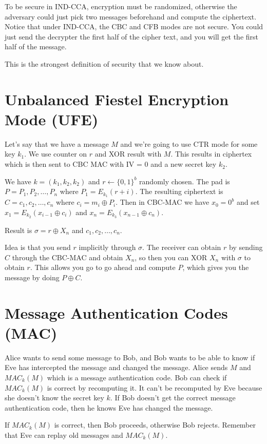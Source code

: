 \documentclass[psamsfonts]{amsart}
\begin{document}
To be secure in IND-CCA, encryption must be randomized, otherwise the adversary could just pick two messages beforehand and compute the ciphertext. Notice that under IND-CCA, the CBC and CFB modes are not secure. You could just send the decrypter the first half of the cipher text, and you will get the first half of the message.

This is the strongest definition of security that we know about.

\section{Unbalanced Fiestel Encryption Mode (UFE)}

Let's say that we have a message $M$ and we're going to use CTR mode for some key $k_1$. We use counter on $r$ and XOR result with $M$. This results in ciphertex which is then sent to CBC MAC with IV = 0 and a new secret key $k_2$.

We have $k = (k_1, k_2, k_2)$ and $r \leftarrow \{0, 1\}^b$ randomly chosen. The pad is $P = P_1, P_2, \ldots, P_n$ where $P_1 = E_{k_1} ( r + i)$. The resulting ciphertext is $C = c_1, c_2, \ldots, c_n$ where $c_i = m_i \oplus P_i$. Then in CBC-MAC we have $x_0 = 0^b$ and set $x_1 = E_{k_2} (x_{i-1} \oplus c_i)$ and $x_n = E_{k_3} (x_{n-1} \oplus c_n)$. 

Result is $\sigma = r \oplus X_n$ and $c_1, c_2, \ldots, c_n$. 

Idea is that you send $r$ implicitly through $\sigma$. The receiver can obtain $r$ by sending $C$ through the CBC-MAC and obtain $X_n$, so then you can XOR $X_n$ with $\sigma$ to obtain $r$. This allows you go to go ahead and compute $P$, which gives you the message by doing $P \oplus C$.

\section{Message Authentication Codes (MAC)}

Alice wants to send some message to Bob, and Bob wants to be able to know if Eve has intercepted the message and changed the message. Alice sends $M$ and $MAC_{k}(M)$ which is a message authentication code. Bob can check if $MAC_{k}(M)$ is correct by recomputing it. It can't be recomputed by Eve because she doesn't know the secret key $k$. If Bob doesn't get the correct message authentication code, then he knows Eve has changed the message.

If $MAC_{k}(M)$ is correct, then Bob proceeds, otherwise Bob rejects. Remember that Eve can replay old messages and $MAC_{k}(M)$.
\end{document}

